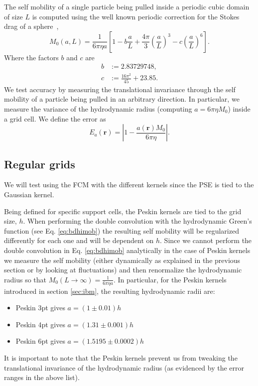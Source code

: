 \documentclass[ twoside,openright,titlepage,numbers=noenddot,%
headinclude,footinclude,cleardoublepage=empty,abstract=on,
BCOR=5mm,paper=b5,fontsize=11pt, dvipsnames
]{scrreprt}
\renewcommand{\vec}[1]{\bm{#1}}
\begin{document}
The self mobility of a single particle being pulled inside a periodic cubic domain of size $L$ is computed using the well known periodic correction for the Stokes drag of a sphere~\cite{Hasimoto1959},
\begin{equation}
  \label{eq:selfmobpbc}
  M_{0}(a,L) = \frac{1}{6\pi\eta a}\left[1-b\frac{a}{L} + \frac{4\pi}{3}\left(\frac{a}{L}\right)^3 - c \left(\frac{a}{L}\right)^6\right].
\end{equation}
Where the factors $b$ and $c$ are
\begin{equation}
  \begin{aligned}
  b &:= 2.83729748,\\
  c &:= \frac{16\pi^2}{45} + 23.85.
  \end{aligned}
\end{equation}
We test accuracy by measuring the translational invariance through the self mobility of a particle being pulled in an arbitrary direction. In particular, we measure the variance of the hydrodynamic radius (computing $a = 6\pi\eta M_{0}$) inside a grid cell.
We define the error as
\begin{equation}
  \label{hydroerr}
  E_a(\vec{r}) = \left|1 - \frac{a(\vec{r})M_{0}}{6\pi\eta}\right|.
\end{equation}


\subsection*{Regular grids}
We will test using the \gls{FCM} with the different kernels since the \gls{PSE} is tied to the Gaussian kernel.

Being defined for specific support cells, the Peskin kernels are tied to the grid size, $h$. When performing the double convolution with the hydrodynamic Green's function (see Eq. \eqref{eq:bdhimob}) the resulting self mobility will be regularized differently for each one and will be dependent on $h$.
Since we cannot perform the double convolution in Eq. \eqref{eq:bdhimob} analytically in the case of Peskin kernels we measure the self mobility (either dynamically as explained in the previous section or by looking at fluctuations) and then renormalize the hydrodynamic radius so that $M_{0}(L\rightarrow\infty) = \frac{1}{6\pi\eta a}$.
In particular, for the Peskin kernels introduced in section \ref{sec:ibm}, the resulting hydrodynamic radii are:
\begin{itemize}
\item Peskin 3pt gives $a=(1\pm 0.01) h$
\item Peskin 4pt gives $a=(1.31\pm 0.001) h$
\item Peskin 6pt gives $a=(1.5195 \pm 0.0002) h$
\end{itemize}
It is important to note that the Peskin kernels prevent us from tweaking the translational invariance of the hydrodynamic radius (as evidenced by the error ranges in the above list).
\end{document}
